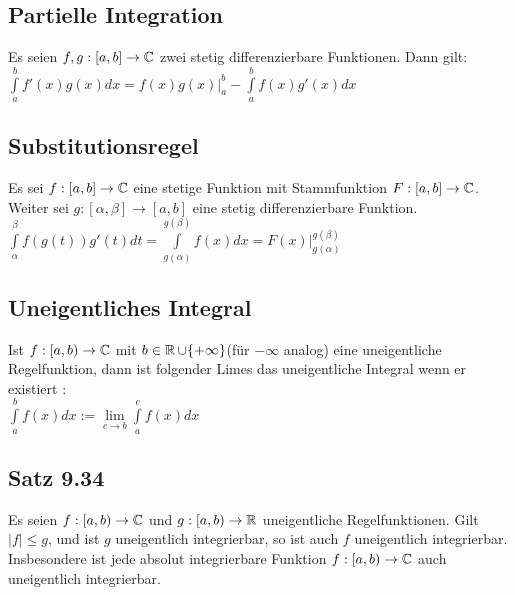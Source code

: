 \documentclass[german]{latex4ei/latex4ei_sheet}
\begin{document}
\begin{sectionbox}
	\subsection{Partielle Integration}
	Es seien $f,g : [a,b] \rightarrow \mathbb C$ zwei stetig differenzierbare Funktionen. Dann gilt:\\
$	\int \limits_a^b f'(x)g(x)dx = \left.f(x)g(x) \right|_a^b - \int \limits_a^b f(x)g'(x)dx$

\end{sectionbox}

\begin{sectionbox}
	\subsection{Substitutionsregel}
	Es sei $f : [a,b] \rightarrow \mathbb C$ eine stetige Funktion mit Stammfunktion $F : [a,b] \rightarrow \mathbb C$. Weiter sei $g : [\alpha,\beta] \rightarrow [a,b]$ eine stetig differenzierbare Funktion.\\
	$\int \limits_\alpha^\beta f(g(t))g'(t)dt = \int \limits_{g(\alpha)}^{g(\beta)} f(x)dx = \left.F(x) \right|_{g(\alpha)}^{g(\beta)} $
	
	

\end{sectionbox}

\begin{sectionbox}
	\subsection{Uneigentliches Integral}
	Ist $f : [a,b) \rightarrow \mathbb C$ mit $b \in  \operatorname{\mathbb R} \cup \{+ \infty\}$(für $-\infty$ analog) eine uneigentliche Regelfunktion,  dann ist folgender Limes das uneigentliche Integral wenn er existiert :\\
	$\int \limits_a^b f(x)dx := \lim \limits_{c \to b} \int \limits_a^c f(x)dx$
	

\end{sectionbox}

\begin{sectionbox}
	\subsection{Satz  9.34}
	Es seien $f : [a, b) \rightarrow \mathbb C$ und $g : [a, b) \rightarrow \operatorname{\mathbb R}$ uneigentliche Regelfunktionen. Gilt $|f| \le  g$, und ist $g$ uneigentlich integrierbar, so ist auch $f$ uneigentlich integrierbar. Insbesondere ist jede absolut integrierbare Funktion $f : [a, b) \rightarrow \mathbb C$ auch uneigentlich integrierbar.

\end{sectionbox}
\end{document}
